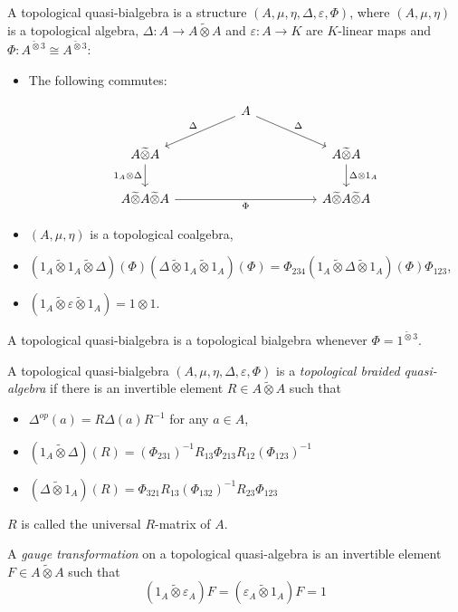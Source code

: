 \documentclass[8pt]{article}
\theoremstyle{definition}
\theoremstyle{definition}
\theoremstyle{definition}
\theoremstyle{definition}
\theoremstyle{definition}
\theoremstyle{definition}
\theoremstyle{definition}
\theoremstyle{definition}
\theoremstyle{definition}
\theoremstyle{definition}
\theoremstyle{definition}
\theoremstyle{definition}
\theoremstyle{definition}
\theoremstyle{definition}
\theoremstyle{question}
\newcommand{\tildetimes}[0]{\widetilde{\otimes}}
\begin{document}
A topological quasi-bialgebra is a structure $(A, \mu, \eta, \Delta, \varepsilon, \Phi)$, where
$(A, \mu, \eta)$ is a topological algebra, $\Delta : A \to A \tildetimes A$ and $\varepsilon : A \to K$ are 
$K$-linear maps and $\Phi : A^{\tildetimes 3} \cong A^{\tildetimes 3}$:
\begin{itemize}
  \item The following commutes:

  \[
  \begin{tikzcd}
    && A \ar[dll, "\Delta"'] \ar[drr, "\Delta"] \\
    A \tildetimes A \ar[d, "1_A \otimes \Delta"'] &&&& A \tildetimes A \ar[d, "\Delta \otimes 1_A"]\\
    A \tildetimes A \tildetimes A \ar[rrrr, "\Phi"'] &&&& A \tildetimes A \tildetimes A
  \end{tikzcd}
  \]
  \item $(A, \mu, \eta)$ is a topological coalgebra,
  \item $(1_A \tildetimes 1_A \tildetimes \Delta)(\Phi) (\Delta \tildetimes 1_A \tildetimes 1_A) (\Phi) = \Phi_{234} (1_A \tildetimes \Delta \tildetimes 1_A)(\Phi) \Phi_{123}$,
  \item $(1_A \tildetimes \varepsilon \tildetimes 1_A) = 1 \otimes 1$.
\end{itemize}
A topological quasi-bialgebra is a topological bialgebra whenever $\Phi = 1^{\tildetimes 3}$.

A topological quasi-bialgebra $(A, \mu, \eta, \Delta, \varepsilon, \Phi)$ is a 
\emph{topological braided quasi-algebra} if there is an invertible element $R \in A \tildetimes A$
such that 
\begin{itemize}
\item $\Delta^{op}(a) = R \Delta(a) R^{-1}$ for any $a \in A$, 
\item $(1_A \tildetimes \Delta)(R) = (\Phi_{231})^{-1} R_{13} \Phi_{213} R_{12} (\Phi_{123})^{-1}$
\item $(\Delta \tildetimes 1_A)(R) = \Phi_{321} R_{13} (\Phi_{132})^{-1} R_{23} \Phi_{123}$
\end{itemize}
$R$ is called the universal $R$-matrix of $A$.

A \emph{gauge transformation} on a topological quasi-algebra is an invertible element 
$F \in A \tildetimes A$ such that 
\[
(1_A \tildetimes \varepsilon_A) F = (\varepsilon_A \tildetimes 1_A) F = 1
\]
\end{document}
